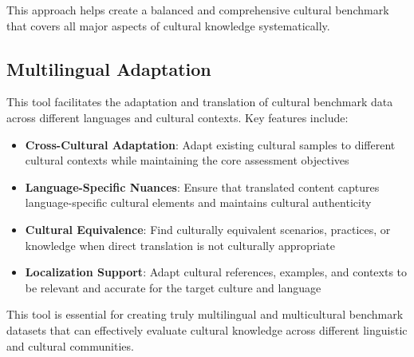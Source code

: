 \documentclass[11pt]{article}
\begin{document}
This approach helps create a balanced and comprehensive cultural benchmark that covers all major aspects of cultural knowledge systematically.

\subsection{Multilingual Adaptation}

This tool facilitates the adaptation and translation of cultural benchmark data across different languages and cultural contexts. Key features include:

\begin{itemize}[itemsep=0.2em]
\item \textbf{Cross-Cultural Adaptation}: Adapt existing cultural samples to different cultural contexts while maintaining the core assessment objectives
\item \textbf{Language-Specific Nuances}: Ensure that translated content captures language-specific cultural elements and maintains cultural authenticity
\item \textbf{Cultural Equivalence}: Find culturally equivalent scenarios, practices, or knowledge when direct translation is not culturally appropriate
\item \textbf{Localization Support}: Adapt cultural references, examples, and contexts to be relevant and accurate for the target culture and language
\end{itemize}

This tool is essential for creating truly multilingual and multicultural benchmark datasets that can effectively evaluate cultural knowledge across different linguistic and cultural communities.
\end{document}
